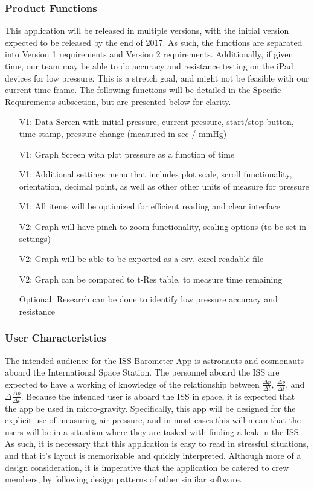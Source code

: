 \documentclass[onecolumn, draftclsnofoot,10pt, compsoc]{IEEEtran}
\def \CapstoneProjectName{ISS Barometer App }
\begin{document}
\subsubsection{Product Functions}
This application will be released in multiple versions, with the initial version expected to be released by the end of 2017.
As such, the functions are separated into Version 1 requirements and Version 2 requirements.
Additionally, if given time, our team may be able to do accuracy and resistance testing on the iPad devices for low pressure.
This is a stretch goal, and might not be feasible with our current time frame.
The following functions will be detailed in the Specific Requirements subsection, but are presented below for clarity.
\begin{itemize}
\item[V1:] Data Screen with initial pressure, current pressure, start/stop button, time stamp, pressure change (measured in sec / mmHg)
\item[V1:] Graph Screen with plot pressure as a function of time
\item[V1:] Additional settings menu that includes plot scale, scroll functionality, orientation, decimal point, as well as other other units of measure for pressure
\item[V1:] All items will be optimized for efficient reading and clear interface
\item[V2:] Graph will have pinch to zoom functionality, scaling options (to be set in settings)
\item[V2:] Graph will be able to be exported as a csv, excel readable file
\item[V2:] Graph can be compared to t-Res table, to measure time remaining
\item[Optional:] Research can be done to identify low pressure accuracy and resistance
\end{itemize}

\subsubsection{User Characteristics}
The intended audience for the \CapstoneProjectName is astronauts and cosmonauts aboard the International Space Station.
The personnel aboard the ISS are expected to have a working of knowledge of the relationship between $\frac{\Delta p}{\Delta t}$, $\frac{\Delta p}{\Delta t}$, and $\Delta \frac{\Delta p}{\Delta t}$.
Because the intended user is aboard the ISS in space, it is expected that the app be used in micro-gravity.
Specifically, this app will be designed for the explicit use of measuring air pressure, and in most cases this will mean that the users will be in a situation where they are tasked with finding a leak in the ISS.
As such, it is necessary that this application is easy to read in stressful situations, and that it's layout is memorizable and quickly interpreted.
Although more of a design consideration, it is imperative that the application be catered to crew members, by following design patterns of other similar software.
\end{document}
